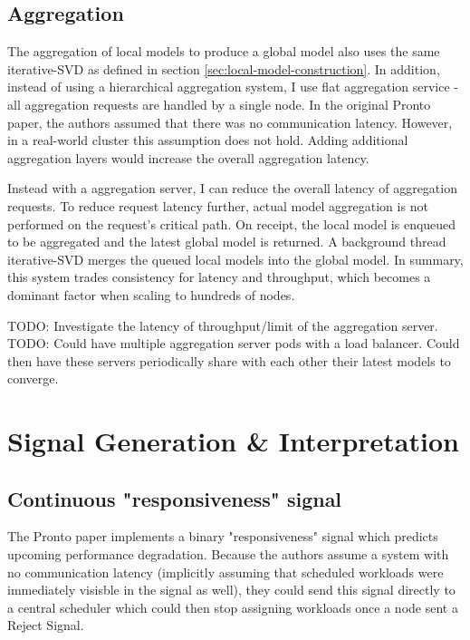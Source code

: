 \subsection{Aggregation}
\label{sec:aggregation}

The aggregation of local models to produce a global model also uses the same
iterative-SVD as defined in section \ref{sec:local-model-construction}. In
addition, instead of using a hierarchical aggregation system, I use flat
aggregation service - all aggregation requests are handled by a single node.
In the original Pronto paper, the authors assumed that there was no
communication latency. However, in a real-world cluster this assumption does not
hold. Adding additional aggregation layers would increase the overall aggregation
latency.

Instead with a aggregation server, I can reduce the overall latency of
aggregation requests. To reduce request latency further, actual model
aggregation is not performed on the request's critical path. On receipt, the local
model is enqueued to be aggregated and the latest global model is returned. A
background thread iterative-SVD merges the queued local models into the global
model. In summary, this system trades consistency for latency and throughput,
which becomes a dominant factor when scaling to hundreds of nodes.

TODO: Investigate the latency of throughput/limit of the aggregation server.
TODO: Could have multiple aggregation server pods with a load balancer. Could
then have these servers periodically share with each other their latest models to
converge.

\section{Signal Generation \& Interpretation}

\subsection{Continuous "responsiveness" signal}
The Pronto paper implements a binary "responsiveness" signal which predicts
upcoming performance degradation. Because the authors assume a system with no
communication latency (implicitly assuming that scheduled workloads were
immediately visisble in the signal as well), they could send this signal
directly to a central scheduler which could then stop assigning workloads once a
node sent a Reject Signal.

